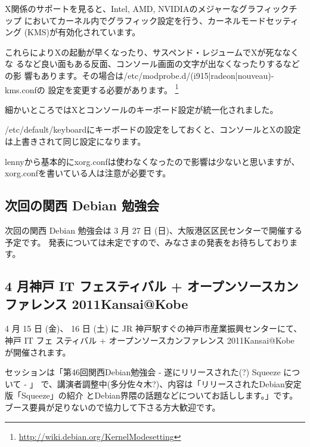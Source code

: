 \documentclass[mingoth,a4paper]{jsarticle}
\begin{document}
X関係のサポートを見ると、Intel, AMD, NVIDIAのメジャーなグラフィックチップ
においてカーネル内でグラフィック設定を行う、カーネルモードセッティング
(KMS)が有効化されています。

これらによりXの起動が早くなったり、サスペンド・レジュームでXが死ななくな
るなど良い面もある反面、コンソール画面の文字が出なくなったりするなどの影
響もあります。その場合は/etc/modprobe.d/(i915|radeon|nouveau)-kms.confの
設定を変更する必要があります。
\footnote{\url{http://wiki.debian.org/KernelModesetting}}

細かいところではXとコンソールのキーボード設定が統一化されました。

/etc/default/keyboardにキーボードの設定をしておくと、コンソールとXの設定
は上書きされて同じ設定になります。

lennyから基本的にxorg.confは使わなくなったので影響は少ないと思いますが、
xorg.confを書いている人は注意が必要です。


\subsection{次回の関西 Debian 勉強会}

次回の関西 Debian 勉強会は 3 月 27 日 (日)、大阪港区区民センターで開催する予定です。
発表については未定ですので、みなさまの発表をお待ちしております。

\subsection{4 月神戸 IT フェスティバル + オープンソースカンファレンス 2011Kansai@Kobe}

4 月 15 日 (金)、 16 日 (土) に JR 神戸駅すぐの神戸市産業振興センターにて、 神戸 IT フェ
スティバル + オープンソースカンファレンス 2011Kansai@Kobe が開催されます。

セッションは「第46回関西Debian勉強会  - 遂にリリースされた(?) Squeeze について - 」
で、講演者調整中(多分佐々木?)、内容は「リリースされたDebian安定版「Squeeze」の紹介
とDebian界隈の話題などについてお話しします。」です。
ブース要員が足りないので協力して下さる方大歓迎です。

\mbox{}\newpage

\printindex
 \cleartooddpage
\end{document}
